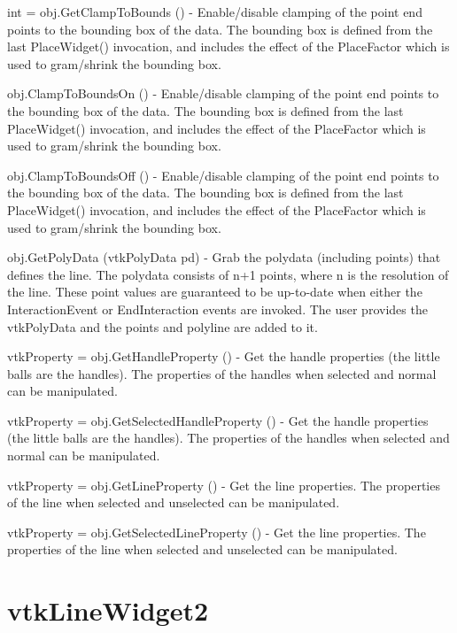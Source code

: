 \begin{DoxyItemize}
\item {\ttfamily int = obj.\-Get\-Clamp\-To\-Bounds ()} -\/ Enable/disable clamping of the point end points to the bounding box of the data. The bounding box is defined from the last Place\-Widget() invocation, and includes the effect of the Place\-Factor which is used to gram/shrink the bounding box.  
\item {\ttfamily obj.\-Clamp\-To\-Bounds\-On ()} -\/ Enable/disable clamping of the point end points to the bounding box of the data. The bounding box is defined from the last Place\-Widget() invocation, and includes the effect of the Place\-Factor which is used to gram/shrink the bounding box.  
\item {\ttfamily obj.\-Clamp\-To\-Bounds\-Off ()} -\/ Enable/disable clamping of the point end points to the bounding box of the data. The bounding box is defined from the last Place\-Widget() invocation, and includes the effect of the Place\-Factor which is used to gram/shrink the bounding box.  
\item {\ttfamily obj.\-Get\-Poly\-Data (vtk\-Poly\-Data pd)} -\/ Grab the polydata (including points) that defines the line. The polydata consists of n+1 points, where n is the resolution of the line. These point values are guaranteed to be up-\/to-\/date when either the Interaction\-Event or End\-Interaction events are invoked. The user provides the vtk\-Poly\-Data and the points and polyline are added to it.  
\item {\ttfamily vtk\-Property = obj.\-Get\-Handle\-Property ()} -\/ Get the handle properties (the little balls are the handles). The properties of the handles when selected and normal can be manipulated.  
\item {\ttfamily vtk\-Property = obj.\-Get\-Selected\-Handle\-Property ()} -\/ Get the handle properties (the little balls are the handles). The properties of the handles when selected and normal can be manipulated.  
\item {\ttfamily vtk\-Property = obj.\-Get\-Line\-Property ()} -\/ Get the line properties. The properties of the line when selected and unselected can be manipulated.  
\item {\ttfamily vtk\-Property = obj.\-Get\-Selected\-Line\-Property ()} -\/ Get the line properties. The properties of the line when selected and unselected can be manipulated.  
\end{DoxyItemize}\hypertarget{vtkwidgets_vtklinewidget2}{}\section{vtk\-Line\-Widget2}\label{vtkwidgets_vtklinewidget2}
